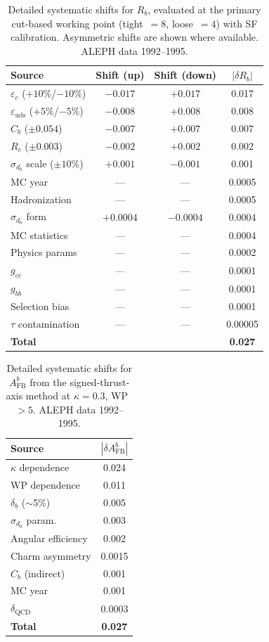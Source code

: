 \documentclass[11pt,a4paper]{article}
\begin{document}
\begin{table}[htbp]
\centering
\caption{Detailed systematic shifts for $R_b$, evaluated at the primary
  cut-based working point (tight~$=8$, loose~$=4$) with SF calibration.
  Asymmetric shifts are shown where available.  ALEPH data 1992--1995.}
\label{tbl:syst-detail-rb}
\begin{tabular}{lccc}
\toprule
Source & Shift (up) & Shift (down) & $|\delta R_b|$ \\
\midrule
$\varepsilon_c$ ($+10\%$/$-10\%$) & $-0.017$ & $+0.017$ & 0.017 \\
$\varepsilon_\mathrm{uds}$ ($+5\%$/$-5\%$) & $-0.008$ & $+0.008$ & 0.008 \\
$C_b$ ($\pm 0.054$) & $-0.007$ & $+0.007$ & 0.007 \\
$R_c$ ($\pm 0.003$) & $-0.002$ & $+0.002$ & 0.002 \\
$\sigma_{d_0}$ scale ($\pm 10\%$) & $+0.001$ & $-0.001$ & 0.001 \\
MC year & --- & --- & 0.0005 \\
Hadronization & --- & --- & 0.0005 \\
$\sigma_{d_0}$ form & $+0.0004$ & $-0.0004$ & 0.0004 \\
MC statistics & --- & --- & 0.0004 \\
Physics params & --- & --- & 0.0002 \\
$g_{c\bar{c}}$ & --- & --- & 0.0001 \\
$g_{b\bar{b}}$ & --- & --- & 0.0001 \\
Selection bias & --- & --- & 0.0001 \\
$\tau$ contamination & --- & --- & 0.00005 \\
\midrule
\textbf{Total} & & & \textbf{0.027} \\
\bottomrule
\end{tabular}
\end{table}

\begin{table}[htbp]
\centering
\caption{Detailed systematic shifts for $A_\mathrm{FB}^b$ from the
  signed-thrust-axis method at $\kappa = 0.3$, WP~$> 5$.
  ALEPH data 1992--1995.}
\label{tbl:syst-detail-afb}
\begin{tabular}{lc}
\toprule
Source & $|\delta A_\mathrm{FB}^b|$ \\
\midrule
$\kappa$ dependence & 0.024 \\
WP dependence & 0.011 \\
$\delta_b$ ($\sim$5\%) & 0.005 \\
$\sigma_{d_0}$ param. & 0.003 \\
Angular efficiency & 0.002 \\
Charm asymmetry & 0.0015 \\
$C_b$ (indirect) & 0.001 \\
MC year & 0.001 \\
$\delta_\mathrm{QCD}$ & 0.0003 \\
\midrule
\textbf{Total} & \textbf{0.027} \\
\bottomrule
\end{tabular}
\end{table}
\end{document}
